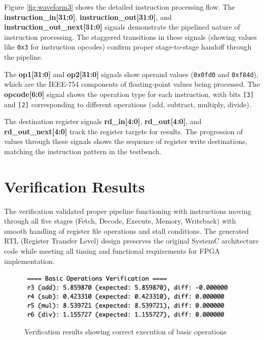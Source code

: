 Figure \ref{fig:waveform3} shows the detailed instruction processing flow. The \textbf{instruction\_in[31:0]}, \textbf{instruction\_out[31:0]}, and \textbf{instruction\_out\_next[31:0]} signals demonstrate the pipelined nature of instruction processing. The staggered transitions in these signals (showing values like \texttt{0x3} for instruction opcodes) confirm proper stage-to-stage handoff through the pipeline.

The \textbf{op1[31:0]} and \textbf{op2[31:0]} signals show operand values (\texttt{0x0fd0} and \texttt{0xf84d}), which are the IEEE-754 components of floating-point values being processed. The \textbf{opcode[6:0]} signal shows the operation type for each instruction, with bits \texttt{[3]} and \texttt{[2]} corresponding to different operations (add, subtract, multiply, divide).

The destination register signals \textbf{rd\_in[4:0]}, \textbf{rd\_out[4:0]}, and \textbf{rd\_out\_next[4:0]} track the register targets for results. The progression of values through these signals shows the sequence of register write destinations, matching the instruction pattern in the testbench.

\section{Verification Results}
\label{sec:verification_results}

The verification validated proper pipeline functioning with instructions moving through all five stages (Fetch, Decode, Execute, Memory, Writeback) with smooth handling of register file operations and stall conditions. The generated RTL (Register Transfer Level) design preserves the original SystemC architecture code while meeting all timing and functional requirements for FPGA implementation.

\begin{figure}[htbp]
    \centering
     \includegraphics[width=0.95\textwidth]{figures/waveform0.png} 
    \caption{Verification results showing correct execution of basic operations}
    \label{fig:console_output2}
\end{figure}

